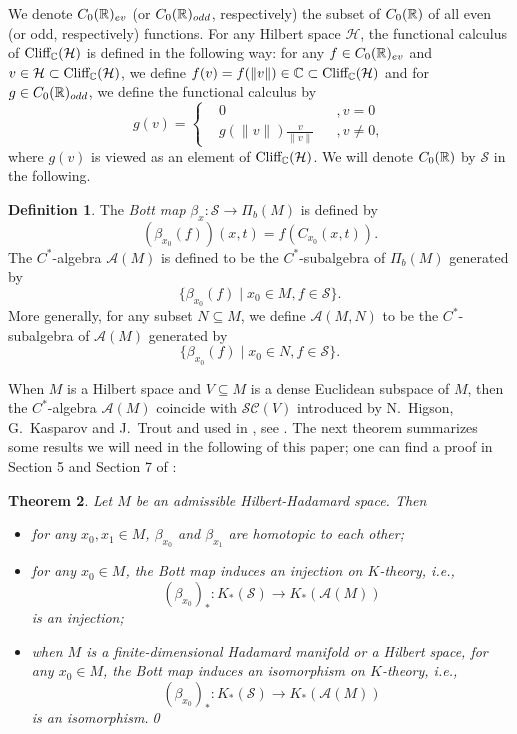 \documentclass[11pt]{article}
\theoremstyle{definition}
\newtheorem{Def}{Definition}[section]
\theoremstyle{plain}
\newtheorem{Thm}[Def]{Theorem}
\def\A{\mathcal A}\def\C{\mathcal C}\def\B{\mathcal B}\def\E{\mathcal E}\def\O{\mathcal O}\def\h{\mathfrak h}\def\K{\mathcal K}\def\F{\mathcal F}\def\P{\mathcal P}\def\L{\mathcal L}\def\R{\mathcal R}\def\Q{\mathcal Q}\def\H{\mathcal H}\def\S{\mathcal S}\def\N{\mathcal N}\def\U{\mathcal U}\def\V{\mathcal V}
\def\Cl{\textup{Cliff}_{\IC}}
\begin{document}
We denote $C_0(\mathbb R)_{ev}$ (or $C_0(\mathbb R)_{odd}$, respectively) the subset of $C_0(\mathbb R)$ of all even (or odd, respectively) functions. For any Hilbert space $\H$, the functional calculus of $\Cl(\H)$ is defined in the following way: for any $f\in C_0(\mathbb R)_{ev}$ and $v\in\H\subset\Cl(\H)$, we define $f(v)=f(\|v\|)\in\IC\subset\Cl(\H)$ and for $g\in C_0(\mathbb R)_{odd}$, we define the functional calculus by
$$g(v)=\left\{\begin{aligned}&0&&,v=0\\&g(\|v\|)\frac{v}{\|v\|}&&,v\ne0,\end{aligned}\right.$$
where $g(v)$ is viewed as an element of $\Cl(\H)$. We will denote $C_0(\mathbb R)$ by $\S$ in the following.

\begin{Def}\label{Bott}
The \emph{Bott map} $\beta_x:\S\to\Pi_b(M)$ is defined by
$$(\beta_{x_0}(f))(x,t)=f(C_{x_0}(x,t)).$$
The $C^*$-algebra $\A(M)$ is defined to be the $C^*$-subalgebra of $\Pi_b(M)$ generated by
$$\{\beta_{x_0}(f)\mid x_0\in M,f\in\S\}.$$
More generally, for any subset $N\subseteq M$, we define $\A(M,N)$ to be the $C^*$-subalgebra of $\A(M)$  generated by
$$\{\beta_{x_0}(f)\mid x_0\in N,f\in\S\}.$$
\end{Def}

When $M$ is a Hilbert space and $V\subseteq M$ is a dense Euclidean subspace of $M$, then the $C^*$-algebra $\A(M)$ coincide with $\S\C(V)$ introduced by N.~Higson, G.~Kasparov and J.~Trout and used in \cite{Yu2000}, see \cite[Remark 7.7]{GWY2018}. The next theorem summarizes some results we will need in the following of this paper; one can find a proof in Section 5 and Section 7 of \cite{GWY2018}:

\begin{Thm}\label{Bott-inj}
Let $M$ be an admissible Hilbert-Hadamard space. Then\begin{itemize}
\item[(1)] for any $x_0,x_1\in M$, $\beta_{x_0}$ and $\beta_{x_1}$ are homotopic to each other;
\item[(2)] for any $x_0\in M$, the Bott map induces an injection on $K$-theory, i.e.,
$$(\beta_{x_0})_*:K_*(\S)\to K_*(\A(M))$$
is an injection;
\item[(3)] when $M$ is a finite-dimensional Hadamard manifold or a Hilbert space, for any $x_0\in M$, the Bott map induces an isomorphism on $K$-theory, i.e.,
$$(\beta_{x_0})_*:K_*(\S)\to K_*(\A(M))$$
is an isomorphism.\qed
\end{itemize}\end{Thm}
\end{document}
